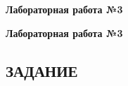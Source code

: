 \documentclass[12pt]{article}
\newcommand{\lablogo}
{
\begin{center}
    \huge{\textbf{Лабораторная работа №3}} \\
\end{center}
}
\newcommand{\colorURL}[1]{\textcolor{CtpBlue}{#1}}
\newcommand{\colorGIT}[1]{\textcolor{CtpLavender}{#1}}
\begin{document}
\pagestyle{empty}

\lablogo

\tableofcontents
\newpage
\renewcommand\listoflistingscaption{Листинг}
\listoflistings

\newpage

\pagestyle{fancy}
%
%
%
%
%
%
%
%
%
%

\newpage

\lablogo

\begin{center}
	\section{ЗАДАНИЕ \ \texorpdfstring{\faScroll}{}}
\end{center}
\end{document}
